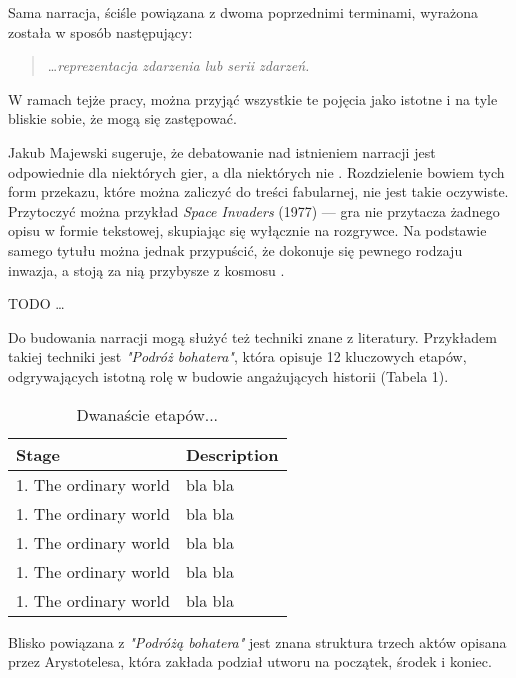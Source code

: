Sama narracja, ściśle powiązana z dwoma poprzednimi terminami, wyrażona została w sposób
następujący:

\begin{quotation}
	\ldots \textit{reprezentacja zdarzenia lub serii zdarzeń.} \cite{narrative_structures}
\end{quotation}

W ramach tejże pracy, można przyjąć wszystkie te pojęcia jako istotne i na tyle bliskie
sobie, że mogą się zastępować.

Jakub Majewski sugeruje, że debatowanie nad istnieniem narracji jest odpowiednie dla niektórych
gier, a dla niektórych nie \cite{theorising_narrative}. Rozdzielenie bowiem tych form
przekazu, które można zaliczyć do treści fabularnej, nie jest takie oczywiste. Przytoczyć można
przykład \textit{Space Invaders} (1977) --- gra nie przytacza żadnego opisu w formie tekstowej,
skupiając się wyłącznie na rozgrywce. Na podstawie samego tytułu można jednak
przypuścić, że dokonuje się pewnego rodzaju inwazja, a stoją za nią przybysze z kosmosu \cite{theorising_narrative}.

TODO \ldots

Do budowania narracji mogą służyć też techniki znane z literatury. Przykładem takiej techniki jest
\textit{"Podróż bohatera"}\cite{narrative_structures}, która opisuje 12 kluczowych etapów, odgrywających
istotną rolę w budowie angażujących historii (Tabela 1).

\begin{table}[ht]
	\caption{Dwanaście etapów...}
	\label{tab1:ch1_1_1}
	\begin{center}
		\begin{tabular}{l l}
			\hline
			Stage                 & Description \\
			\hline
			1. The ordinary world & bla bla     \\
			1. The ordinary world & bla bla     \\
			1. The ordinary world & bla bla     \\
			1. The ordinary world & bla bla     \\
			1. The ordinary world & bla bla     \\
			\hline
		\end{tabular}
	\end{center}
\end{table}

Blisko powiązana z \textit{"Podróżą bohatera"} jest znana struktura trzech aktów opisana przez
Arystotelesa, która zakłada podział utworu na początek, środek i koniec\cite{narrative_structures}.

